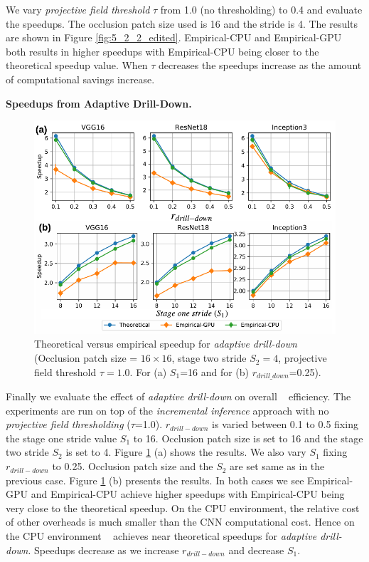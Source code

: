 We vary \textit{projective field threshold} $\tau$ from 1.0 (no thresholding) to 0.4 and evaluate the speedups.
The occlusion patch size used is 16 and the stride is 4.
The results are shown in Figure \ref{fig:5_2_2_edited}.
Empirical-CPU and Empirical-GPU both results in higher speedups with Empirical-CPU being closer to the theoretical speedup value.
When $\tau$ decreases the speedups increase as the amount of computational savings increase.

\vspace{2mm}
\noindent \textbf{Speedups from Adaptive Drill-Down.}

\begin{figure}[t]
\includegraphics[width=\columnwidth]{images/5_2_3_edited}
\caption{Theoretical versus empirical speedup for \textit{adaptive drill-down} (Occlusion patch size = $16 \times 16$, stage two stride $S_2=4$, projective field threshold $\tau=1.0$. For (a) $S_1$=16 and for (b) $r_{drill\_down}$=0.25).}
\label{fig:5_2_3_edited}
\end{figure}

Finally we evaluate the effect of \textit{adaptive drill-down} on overall \system~ efficiency.
The experiments are run on top of the \textit{incremental inference} approach with no \textit{projective field thresholding} ($\tau$=1.0).
$r_{drill-down}$ is varied between 0.1 to 0.5 fixing the stage one stride value $S_1$ to 16.
Occlusion patch size is set to 16 and the stage two stride $S_2$ is set to 4.
Figure \ref{fig:5_2_3_edited} (a) shows the results.
We also vary $S_1$ fixing $r_{drill-down}$ to 0.25.
Occlusion patch size and the $S_2$ are set same as in the previous case.
Figure \ref{fig:5_2_3_edited} (b) presents the results.
In both cases we see Empirical-GPU and Empirical-CPU achieve higher speedups with Empirical-CPU being very close to the theoretical speedup.
On the CPU environment, the relative cost of other overheads is much smaller than the CNN computational cost.
Hence on the CPU environment \system~ achieves near theoretical speedups for \textit{adaptive drill-down}.
Speedups decrease as we increase $r_{drill-down}$ and decrease $S_1$.

